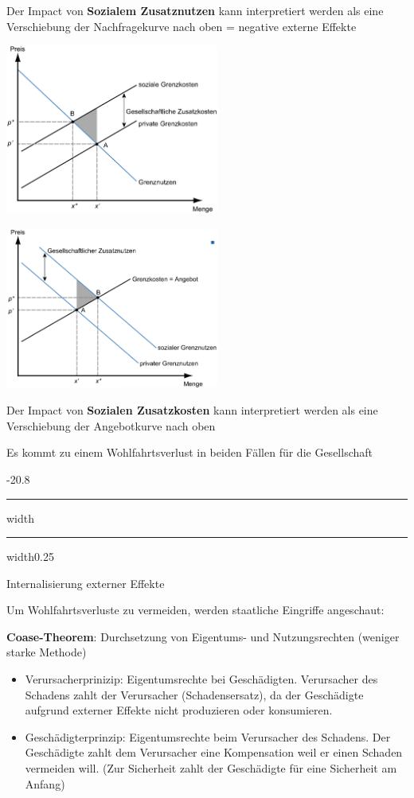 \documentclass[9pt, landscape, fleqn]{scrartcl}
\makeatletter
\renewcommand{\subsection}{\@startsection{subsection}{1}{0mm}%
{-2\baselineskip}{0.8\baselineskip}%
{\hrule depth 0.2pt width\columnwidth\hrule depth0.75pt
width0.25\columnwidth\vspace*{1.2em}\large\bfseries\rmfamily}}
\makeatother
\begin{document}
\begin{multicols*}{3}
Der Impact von \textbf{Sozialem Zusatznutzen} kann interpretiert werden als eine Verschiebung der Nachfragekurve nach oben = negative externe Effekte

\begin{center}
    \includegraphics[width=7cm]{Negative_Effekte.png}
\end{center}

\begin{center}
    \includegraphics[width=7cm]{Positive_Effekte.png}
\end{center}

Der Impact von \textbf{Sozialen Zusatzkosten} kann interpretiert werden als eine Verschiebung der Angebotkurve nach oben  \newline 

Es kommt zu einem Wohlfahrtsverlust in beiden Fällen für die Gesellschaft 

\subsection{Internalisierung externer Effekte}

Um Wohlfahrtsverluste zu vermeiden, werden staatliche Eingriffe angeschaut: \newline

\textbf{Coase-Theorem}: Durchsetzung von Eigentums- und Nutzungsrechten (weniger starke Methode)

\begin{itemize}
    \item Verursacherprinizip: Eigentumsrechte bei Geschädigten. Verursacher des Schadens zahlt der Verursacher (Schadensersatz), da der Geschädigte aufgrund externer Effekte nicht produzieren oder konsumieren.
    \item Geschädigterprinzip: Eigentumsrechte beim Verursacher des Schadens. Der Geschädigte zahlt dem Verursacher eine Kompensation weil er einen Schaden vermeiden will. (Zur Sicherheit zahlt der Geschädigte für eine Sicherheit am Anfang)
\end{itemize}




\end{multicols*}
\end{document}
